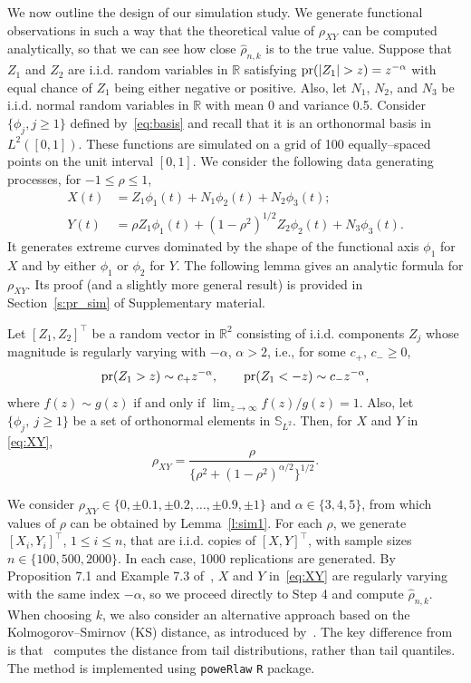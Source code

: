 \documentclass[lineno]{biometrika}
\newcommand \ag{\alpha}
\newcommand\mbR{{\mathbb R}}
\newcommand\mbS{{\mathbb S}}
\begin{document}
We now outline the design of our simulation study. We generate functional observations in such a way that the theoretical value of $\rho_{XY}$ can be computed analytically, so that we can see how close $\hat{\rho}_{n,k}$ is to the true value. Suppose that $Z_1$ and $Z_2$ are i.i.d. random variables in $\mbR$ satisfying ${\rm pr}(|Z_{1}|>z) = z^{-\ag}$ with equal chance of $Z_1$ being either negative or positive. Also, let $N_1$, $N_2$, and $N_3$ be i.i.d. normal random variables in $\mbR$ with mean 0 and variance 0.5. Consider $\{\phi_j, j \ge 1 \}$ defined by~\eqref{eq:basis} and recall that it is an  orthonormal basis in $L^2([0,1])$. These functions are simulated on a grid of 100 equally--spaced points on the unit interval $[0,1]$. We consider the following data generating processes, for $-1 \le \rho \le 1$,
\begin{align} \label{eq:XY}
X(t) &= Z_{1}\phi_1(t) + N_1\phi_2(t) +  N_2\phi_3(t); \\ \nonumber
Y(t) &= \rho Z_{1}\phi_1(t) + (1-\rho^2)^{1/2} Z_{2}\phi_2(t) + N_3\phi_3(t).
\end{align}
It generates extreme curves dominated by the shape of the functional axis $\phi_1$ for $X$ and  by either $\phi_1$ or $\phi_2$ for $Y$.  The following lemma gives an analytic formula for $\rho_{XY}$. Its proof (and a slightly more general result) is provided in Section~\ref{s:pr_sim} of Supplementary material.

\begin{lemma} \label{l:sim1} Let $[Z_1, Z_2]^{\top}$ be a random vector in $\mbR^2$ consisting of i.i.d. components $Z_j$ whose magnitude is regularly varying with $-\ag$, $\ag>2$, i.e., for some $c_{+}$, $c_{-}\ge 0$,
\[
{\rm pr}(Z_1 >z) \sim c_{+}z^{-\ag}, \quad\quad {\rm pr}(Z_1 <-z) \sim c_{-}z^{-\ag},
\]
where $f(z) \sim g(z)$ if and only if $\lim_{z\to \infty}f(z)/g(z)=1$.
Also, let $\{\phi_j,\ j \ge 1\}$ be a set of orthonormal elements in $\mbS_{L^2}$. Then, for  $X$ and $Y$ in \eqref{eq:XY},
\[
\rho_{XY} = \frac{\rho}{\{\rho^2 + (1-\rho^2)^{\ag/2}\}^{1/2}}.
\]
\end{lemma}



We consider $\rho_{XY} \in \{0, \pm0.1, \pm0.2, \ldots, \pm 0.9, \pm 1 \}$ and $\ag \in\{3,4,5\}$, from which values of $\rho$ can be obtained by Lemma~\ref{l:sim1}. For each $\rho$, we generate $[X_i, Y_i]^{\top}$, $1 \le i \le n$, that are i.i.d. copies of $[X,Y]^{\top}$, with sample sizes $n \in \{100, 500, 2000\}$. In each case, 1000 replications are generated. By Proposition 7.1 and Example 7.3 of~\citet{meinguet:segers:2010}, $X$ and $Y$ in~\eqref{eq:XY} are regularly varying with the same index $-\ag$, so we proceed directly to Step 4 and compute $\hat{\rho}_{n,k}$. When choosing $k$, we also consider an alternative approach based on the Kolmogorov–Smirnov (KS) distance, as introduced by~\citet{clauset:shalizi:newman:2009}. The key difference from~\citet{danielsson:Ergun:deHaan:deVries:2016} is that~\citet{clauset:shalizi:newman:2009} computes the distance from tail distributions, rather than tail quantiles. The method is implemented using {\tt poweRlaw} {\tt R} package.
\end{document}

